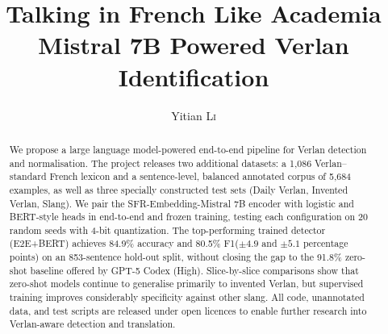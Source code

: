 \documentclass[12pt]{article}
\title{Talking in French Like Academia\\\large Mistral 7B Powered Verlan Identification}
\author{Yitian \textsc{Li}}
\begin{document}
\maketitle

\begin{abstract}
We propose a large language model-powered end-to-end pipeline for Verlan detection and normalisation.
The project releases two additional datasets: a 1,086 Verlan--standard French lexicon and a sentence-level, balanced annotated corpus of 5,684 examples, as well as three specially constructed test sets (Daily Verlan, Invented Verlan, Slang).
We pair the SFR-Embedding-Mistral 7B encoder with logistic and BERT-style heads in end-to-end and frozen training, testing each configuration on 20 random seeds with 4-bit quantization.
The top-performing trained detector (E2E+BERT) achieves 84.9\% accuracy and 80.5\% F1(\(\pm 4.9\) and \(\pm 5.1\) percentage points) on an 853-sentence hold-out split, without closing the gap to the 91.8\% zero-shot baseline offered by GPT-5 Codex (High).
Slice-by-slice comparisons show that zero-shot models continue to generalise primarily to invented Verlan, but supervised training improves considerably specificity against other slang.
All code, unannotated data, and test scripts are released under open licences to enable further research into Verlan-aware detection and translation.

\end{abstract}
\end{document}
